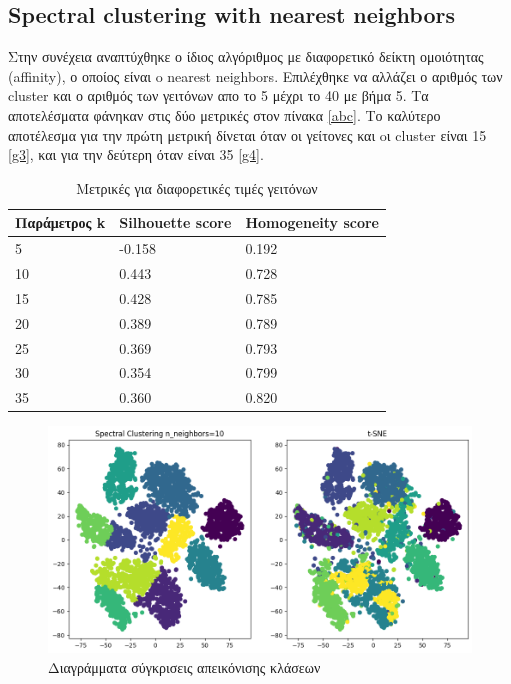 \clearpage

\subsection{Spectral clustering with nearest neighbors}

Στην συνέχεια αναπτύχθηκε ο ίδιος αλγόριθμος με διαφορετικό δείκτη ομοιότητας (affinity), ο οποίος είναι o nearest neighbors. Επιλέχθηκε να αλλάζει ο αριθμός των cluster και ο αριθμός των γειτόνων απο το 5 μέχρι το 40 με βήμα 5. Τα αποτελέσματα φάνηκαν στις δύο μετρικές στον πίνακα \ref{abc}. Το καλύτερο αποτέλεσμα για την πρώτη μετρική δίνεται όταν οι γείτονες και oι cluster είναι 15 \ref{g3}, και για την δεύτερη όταν είναι 35 \ref{g4}.

\begin{table}[ht]
	\centering
	\caption{Μετρικές για διαφορετικές τιμές γειτόνων}
	\begin{tabular}{l | l | l}
		Παράμετρος k & Silhouette score &  Homogeneity score\\
		\hline
		5 & -0.158 & 0.192\\
		10 & 0.443 & 0.728\\
		15 & 0.428&0.785\\
		20 & 0.389 & 0.789\\
		25 &0.369 & 0.793\\
		30 & 0.354 & 0.799\\
		35 & 0.360 & 0.820\\
	\end{tabular}
	
	\label{tab:abc}
\end{table}
\begin{figure}[ht]
	\centering
	\includegraphics[width=1\linewidth]{Imagedata1/n_15tsne.png}
	\caption{ Διαγράμματα σύγκρισεις απεικόνισης κλάσεων }
	\label{f:g3}	
\end{figure}
